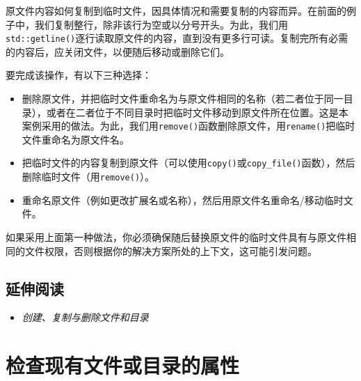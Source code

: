 
原文件内容如何复制到临时文件，因具体情况和需要复制的内容而异。在前面的例子中，我们复制整行，除非该行为空或以分号开头。为此，我们用\texttt{std::\allowbreak{}getline()}逐行读取原文件的内容，直到没有更多行可读。复制完所有必需的内容后，应关闭文件，以便随后移动或删除它们。



要完成该操作，有以下三种选择：



\begin{itemize}
\item 删除原文件，并把临时文件重命名为与原文件相同的名称（若二者位于同一目录），或者在二者位于不同目录时把临时文件移动到原文件所在位置。这是本案例采用的做法。为此，我们用\texttt{remove()}函数删除原文件，用\texttt{rename()}把临时文件重命名为原文件名。



\item 把临时文件的内容复制到原文件（可以使用\texttt{copy()}或\texttt{copy\_\allowbreak{}file()}函数），然后删除临时文件（用\texttt{remove()}）。



\item 重命名原文件（例如更改扩展名或名称），然后用原文件名重命名/移动临时文件。

\end{itemize}



\begin{myNote}[tip]
如果采用上面第一种做法，你必须确保随后替换原文件的临时文件具有与原文件相同的文件权限，否则根据你的解决方案所处的上下文，这可能引发问题。
\end{myNote}



\subsection{延伸阅读}



\begin{itemize}
\item \textit{创建、复制与删除文件和目录}

\end{itemize}



\section{检查现有文件或目录的属性}


